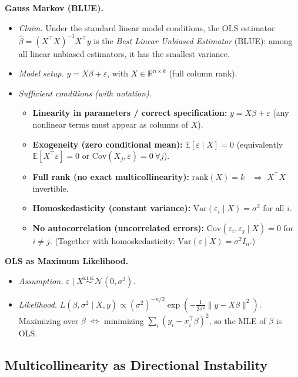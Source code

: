 \textbf{Gauss Markov (BLUE).}
\begin{itemize}\itemsep0.2em
\item \emph{Claim.} Under the standard linear model conditions, the OLS estimator
$\hat\beta=(X^\top X)^{-1}X^\top y$ is the \emph{Best Linear Unbiased Estimator} (BLUE): among all linear unbiased estimators, it has the smallest variance.
\item \emph{Model setup.} $y = X\beta + \varepsilon$, with $X\in\mathbb{R}^{n\times k}$ (full column rank).
\item \emph{Sufficient conditions (with notation).}
  \begin{itemize}\itemsep0.15em
  \item \textbf{Linearity in parameters / correct specification:}
        $y = X\beta + \varepsilon$ (any nonlinear terms must appear as columns of $X$).
  \item \textbf{Exogeneity (zero conditional mean):}
        $\mathbb{E}[\varepsilon\mid X]=0$ \quad (equivalently $\mathbb{E}[X^\top\varepsilon]=0$ or $\mathrm{Cov}(X_j,\varepsilon)=0\ \forall j$).
  \item \textbf{Full rank (no exact multicollinearity):}
        $\mathrm{rank}(X)=k$ \ $\Rightarrow$ $X^\top X$ invertible.
  \item \textbf{Homoskedasticity (constant variance):}
        $\mathrm{Var}(\varepsilon_i\mid X)=\sigma^2$ for all $i$.
  \item \textbf{No autocorrelation (uncorrelated errors):}
        $\mathrm{Cov}(\varepsilon_i,\varepsilon_j\mid X)=0$ for $i\neq j$.
        \quad (Together with homoskedasticity: $\mathrm{Var}(\varepsilon\mid X)=\sigma^2 I_n$.)
  \end{itemize}
\end{itemize}

\textbf{OLS as Maximum Likelihood.}
\begin{itemize}\itemsep0.2em
\item \emph{Assumption.} $\varepsilon\mid X \stackrel{\text{i.i.d.}}{\sim} \mathcal{N}(0,\sigma^2)$.
\item \emph{Likelihood.} 
$L(\beta,\sigma^2\mid X,y)\propto (\sigma^2)^{-n/2}\exp\!\left(-\tfrac{1}{2\sigma^2}\|y-X\beta\|^2\right)$.
Maximizing over $\beta$ $\Longleftrightarrow$ minimizing $\sum_i (y_i-x_i^\top\beta)^2$, so the MLE of $\beta$ is OLS.
\end{itemize}



\subsection{Multicollinearity as Directional Instability}


